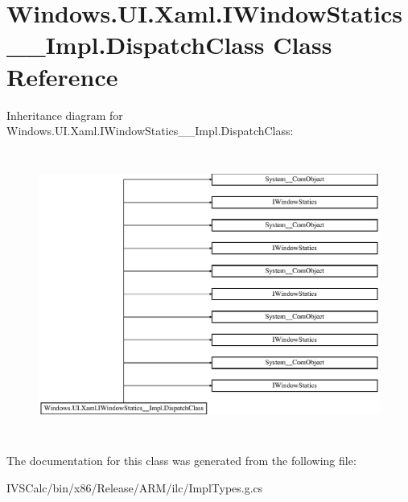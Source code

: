 \hypertarget{class_windows_1_1_u_i_1_1_xaml_1_1_i_window_statics_____impl_1_1_dispatch_class}{}\section{Windows.\+U\+I.\+Xaml.\+I\+Window\+Statics\+\_\+\+\_\+\+Impl.\+Dispatch\+Class Class Reference}
\label{class_windows_1_1_u_i_1_1_xaml_1_1_i_window_statics_____impl_1_1_dispatch_class}
Inheritance diagram for Windows.\+U\+I.\+Xaml.\+I\+Window\+Statics\+\_\+\+\_\+\+Impl.\+Dispatch\+Class\+:\begin{figure}[H]
\begin{center}
\leavevmode
\includegraphics[height=9.476923cm]{class_windows_1_1_u_i_1_1_xaml_1_1_i_window_statics_____impl_1_1_dispatch_class}
\end{center}
\end{figure}


The documentation for this class was generated from the following file\+:\begin{DoxyCompactItemize}
\item 
I\+V\+S\+Calc/bin/x86/\+Release/\+A\+R\+M/ilc/Impl\+Types.\+g.\+cs\end{DoxyCompactItemize}
